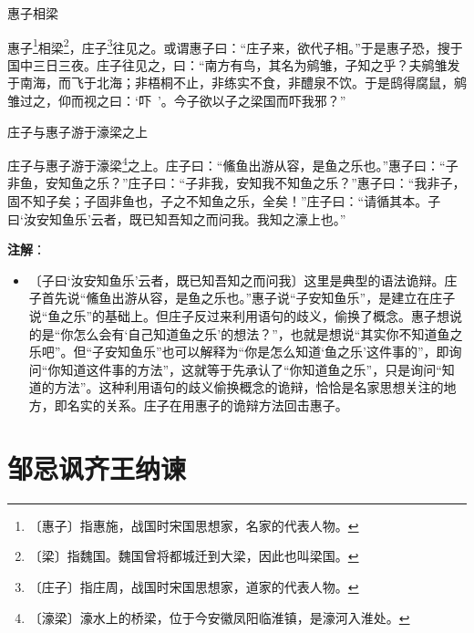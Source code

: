 \documentclass[12pt,UTF-8,openany]{ctexbook}
\begin{document}
\begin{normalsize}
    
    惠子相梁
    
    惠子\footnote{〔惠子〕指惠施，战国时宋国思想家，名家的代表人物。}相梁\footnote{〔梁〕指魏国。魏国曾将都城迁到大梁，因此也叫梁国。}，庄子\footnote{〔庄子〕指庄周，战国时宋国思想家，道家的代表人物。}往见之。或谓惠子曰：“庄子来，欲代子相。”于是惠子恐，搜于国中三日三夜。庄子往见之，曰：“南方有鸟，其名为鹓雏，子知之乎？夫鹓雏发于南海，而飞于北海；非梧桐不止，非练实不食，非醴泉不饮。于是鸱得腐鼠，鹓雏过之，仰而视之曰：‘吓~’。今子欲以子之梁国而吓我邪？”
    
    庄子与惠子游于濠梁之上
    
    庄子与惠子游于濠梁\footnote{〔濠梁〕濠水上的桥梁，位于今安徽凤阳临淮镇，是濠河入淮处。}之上。庄子曰：“鯈鱼出游从容，是鱼之乐也。”惠子曰：“子非鱼，安知鱼之乐？”庄子曰：“子非我，安知我不知鱼之乐？”惠子曰：“我非子，固不知子矣；子固非鱼也，子之不知鱼之乐，全矣！”庄子曰：“请循其本。子曰‘汝安知鱼乐’云者，既已知吾知之而问我。我知之濠上也。”
\end{normalsize}


\newpage

\textbf{注解}：

\vspace{-1em}

\begin{itemize}
    \setlength\itemsep{-0.2em}
    \item〔子曰‘汝安知鱼乐’云者，既已知吾知之而问我〕这里是典型的语法诡辩。庄子首先说“鯈鱼出游从容，是鱼之乐也。”惠子说“子安知鱼乐”，是建立在庄子说“鱼之乐”的基础上。但庄子反过来利用语句的歧义，偷换了概念。惠子想说的是“你怎么会有‘自己知道鱼之乐’的想法？”，也就是想说“其实你不知道鱼之乐吧”。但“子安知鱼乐”也可以解释为“你是怎么知道‘鱼之乐’这件事的”，即询问“你知道这件事的方法”，这就等于先承认了“你知道鱼之乐”，只是询问“知道的方法”。这种利用语句的歧义偷换概念的诡辩，恰恰是名家思想关注的地方，即名实的关系。庄子在用惠子的诡辩方法回击惠子。
\end{itemize}

\chapter{邹忌讽齐王纳谏}
\end{document}
